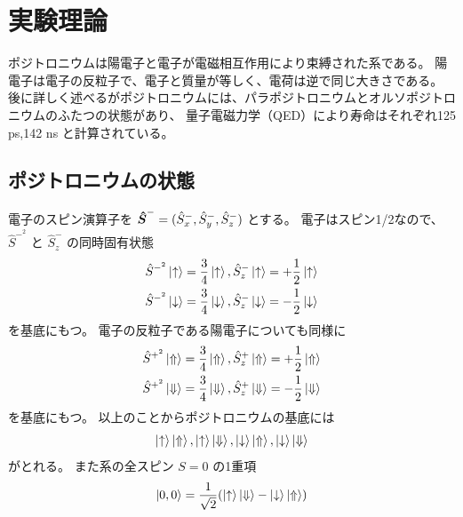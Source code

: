 \chapter{実験理論}\label{theory}



ポジトロニウムは陽電子と電子が電磁相互作用により束縛された系である。
陽電子は電子の反粒子で、電子と質量が等しく、電荷は逆で同じ大きさである。
後に詳しく述べるがポジトロニウムには、パラポジトロニウムとオルソポジトロニウムのふたつの状態があり、
量子電磁力学（QED）により寿命はそれぞれ125 ps,142 ns と計算されている。


\section{ポジトロニウムの状態}

電子のスピン演算子を
$\mbox{\boldmath $\hat{S}$}^{-} = (\hat{S}^{-}_{x},\hat{S}^{-}_{y},\hat{S}^{-}_{z})$
とする。
電子はスピン1/2なので、
$\hat{S}^{-^{2}}$
と
$\hat{S}^{-}_{z}$
の同時固有状態
\begin{equation}
\begin{split}
\hat{S}^{-^{2}} \ket{ \uparrow } = \frac{3}{4} \ket{ \uparrow },
\hat{S}^{-}_{z} \ket{ \uparrow } = + \frac{1}{2} \ket{ \uparrow } \\
\hat{S}^{-^{2}} \ket{ \downarrow } = \frac{3}{4} \ket{ \downarrow },
\hat{S}^{-}_{z} \ket{ \downarrow } = - \frac{1}{2} \ket{ \downarrow }
\end{split}
\label{eq:groundele}
\end{equation}
を基底にもつ。
電子の反粒子である陽電子についても同様に
\begin{equation}
\begin{split}
\hat{S}^{+^{2}} \ket{ \Uparrow } = \frac{3}{4} \ket{ \Uparrow },
\hat{S}^{+}_{z} \ket{ \Uparrow } = + \frac{1}{2} \ket{ \Uparrow } \\
\hat{S}^{+^{2}} \ket{ \Downarrow } = \frac{3}{4} \ket{ \Downarrow },
\hat{S}^{+}_{z} \ket{ \Downarrow } = - \frac{1}{2} \ket{ \Downarrow }
\end{split}
\label{eq:groundeposi}
\end{equation}
を基底にもつ。
以上のことからポジトロニウムの基底には
\begin{equation}
	\nonumber
\ket{ \uparrow } \ket{ \Uparrow },\ket{ \uparrow } \ket{ \Downarrow },
\ket{ \downarrow } \ket{ \Uparrow },\ket{ \downarrow } \ket{ \Downarrow }
\end{equation}
がとれる。
また系の全スピン $S = 0$ の1重項
\begin{equation}
\ket{0,0} = \frac{1}{\sqrt{2}} ( \ket{ \uparrow } \ket{ \Downarrow } - \ket{ \downarrow } \ket{ \Uparrow })
\label{eq:para}
\end{equation}
